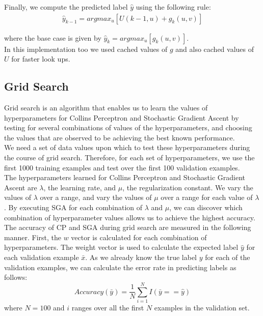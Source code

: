 \documentclass[11pt,a4paper,oneside]{article}
\begin{document}
Finally, we compute the predicted label $\hat{y}$ using the following rule:
\begin{align}
\hat{y}_{k-1} = argmax_{u}[U(k - 1, u) + g_k(u, v)]
\end{align}

where the base case is given by $\hat{y}_k = argmax_{u}[g_k(u, v)]$.\\

In this implementation too we used cached values of $g$ and also cached values of $U$ for faster look ups.

\subsection{Grid Search}

Grid search is an algorithm that enables us to learn the values of hyperparameters for Collins Perceptron and Stochastic Gradient Ascent by testing for several combinations of values of the hyperparameters, and choosing the values that are observed to be achieving the best known performance.\\

We need a set of data values upon which to test these hyperparameters during the course of grid search. Therefore, for each set of hyperparameters, we use the first 1000 training examples and test over the first 100 validation examples.\\

The hyperparameters learned for Collins Perceptron and Stochastic Gradient Ascent are $\lambda$, the learning rate, and $\mu$, the regularization constant. We vary the values of $\lambda$ over a range, and vary the values of $\mu$ over a range for each value of $\lambda$. By executing SGA for each combination of $\lambda$ and $\mu$, we can discover which combination of hyperparameter values allows us to achieve the highest accuracy.\\

The accuracy of CP and SGA during grid search are measured in the following manner. First, the $w$ vector is calculated for each combination of hyperparameters. The weight vector is used to calculate the expected label $\hat{y}$ for each validation example $\bar{x}$. As we already know the true label $y$ for each of the validation examples, we can calculate the error rate in predicting labels as follows:
\begin{equation}
Accuracy(\bar{y}) = \frac{1}{N}\sum_{i = 1}^{N}I(\bar{y} == \hat{y})
\end{equation}
where $N = 100$ and $i$ ranges over all the first $N$ examples in the validation set.
\end{document}
